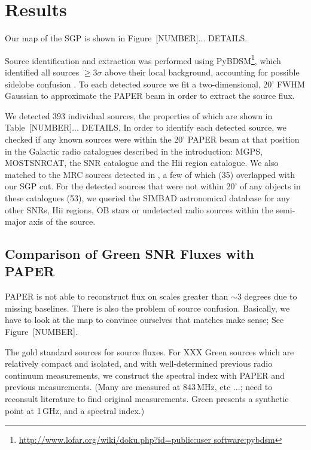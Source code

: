 \documentclass[useAMS,usenatbib]{mn2e}
\begin{document}
\section{Results}
\label{sec:res}

Our map of the SGP is shown in Figure~{\color{red}[NUMBER]... DETAILS}.

Source identification and extraction was performed using PyBDSM\footnote{\url{http://www.lofar.org/wiki/doku.php?id=public:user software:pybdsm}}, which identified all sources $\geq3\sigma$ above their local background, accounting for possible sidelobe confusion \citep{PyBDSM.15}. To each detected source we fit a two-dimensional, 20' FWHM Gaussian to approximate the PAPER beam \citep{Parsons.10} in order to extract the source flux. 

We detected $393$ individual sources, the properties of which are shown in Table~{\color{red}[NUMBER]... DETAILS}. In order to identify each detected source, we checked if any known sources were within the 20' PAPER beam at that position in the Galactic radio catalogues described in the introduction: MGPS, MOSTSNRCAT, the \cite{DAGreen.14} SNR catalogue and the \cite{Paladini.03} H{\sc ii} region catalogue. We also matched to the MRC sources detected in \cite{Jacobs.11}, a few of which (35) overlapped with our SGP cut. For the detected sources that were not within 20' of any objects in these catalogues (53), we queried the SIMBAD astronomical database \citep{Wegner.00} for any other SNRs,  H{\sc ii} regions, {\color{red}OB stars} or undetected radio sources within the semi-major axis of the source.



\subsection{Comparison of Green SNR Fluxes with PAPER}

PAPER is not able to reconstruct flux on scales greater than $\sim3$
degrees due to missing baselines.  There is also the problem of source
confusion.  Basically, we have to look at the map to convince
ourselves that matches make sense; See Figure~{\color{red}[NUMBER]}.


{\color{red} The gold standard sources for source fluxes.}
For XXX Green sources which are relatively compact
and isolated, and with well-determined previous radio continuum
measurements, we construct the spectral index with PAPER and previous
measurements.  (Many are measured at 843\,MHz, etc ...; need to
reconsult literature to find original measurements.  Green presents a
synthetic point at 1\,GHz, and a spectral index.)
\end{document}
